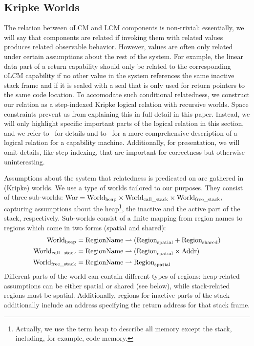 \documentclass[acmsmall,screen]{acmart}\settopmatter{}
\renewcommand{\Worlds}{\World_{\mathrm{call\_stack}}}
\renewcommand{\Worldfs}{\World_{\mathrm{free\_stack}}}
\newcommand{\trgcm}{\textsc{LCM}}
\newcommand{\srccm}{\textsc{oLCM}}
\begin{document}
\subsection{Kripke Worlds}
\label{subsec:worlds}
The relation between \srccm{} and \trgcm{} components is non-trivial: essentially, we will say that components are related if invoking them with related values produces related observable behavior.
However, values are often only related under certain assumptions about the rest of the system.
For example, the linear data part of a return capability should only be related to the corresponding \srccm{} capability if no other value in the system references the same inactive stack frame and if it is sealed with a seal that is only used for return pointers to the same code location.
To accomodate such conditional relatedness, we construct our relation as a step-indexed Kripke logical relation with recursive worlds.
Space constraints prevent us from explaining this in full detail in this paper. 
Instead, we will only highlight specific important parts of the logical relation in this section, and we refer to~\citet{technical_report} for details and to~\citet{skorstengaard_reasoning_2017} for a more comprehensive description of a logical relation for a capability machine.
Additionally, for presentation, we will omit details, like step indexing, that are important for correctness but otherwise uninteresting.

Assumptions about the system that relatedness is predicated on are gathered in (Kripke) worlds. 
We use a type of worlds tailored to our purposes.
They consist of three sub-worlds: $\Wor = \Worldh \times \Worlds \times \Worldfs$, capturing assumptions about the heap\footnote{Actually, we use the term heap to describe all memory except the stack, including, for example, code memory.}, the inactive and the active part of the stack, respectively.
Sub-worlds consist of a finite mapping from region names to regions which come in two forms (spatial and shared):
\begin{align*}
  \Worldh  &={} \RegionName \parfun (\Regions + \Regionh)\\
  \Worlds  &={} \RegionName \parfun (\Regions \times \Addr)\\
  \Worldfs &={} \RegionName \parfun \Regions
\end{align*}
Different parts of the world can contain different types of regions: heap-related assumptions can be either spatial or shared (see below), while stack-related regions must be spatial.
Additionally, regions for inactive parts of the stack additionally include an address specifying the return address for that stack frame.
\end{document}
